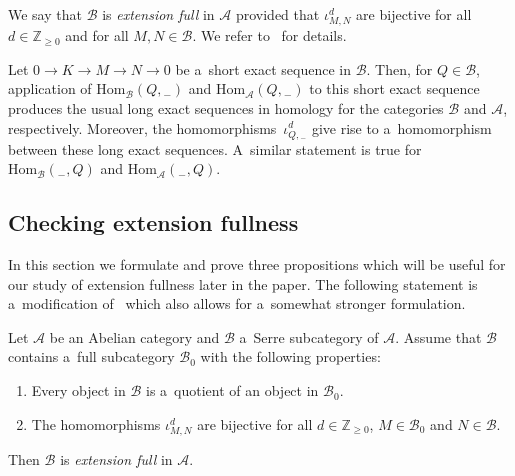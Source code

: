 \documentclass[pdftex]{sigma}
\begin{document}
We say that $\mathcal{B}$ is {\em extension full} in $\mathcal{A}$ provided that $\iota^d_{M,N}$ are bijective for all
$d\in\mathbb{Z}_{\geq0}$ and for all $M,N\in\mathcal{B}$.
We refer to~\cite[Section~2]{CoMa} for details.

Let $0\to K\to M\to N\to 0$ be a~short exact sequence in $\mathcal{B}$.
Then, for $Q\in \mathcal{B}$, application of $\mathrm{Hom}_{\mathcal{B}}(Q,{}_-)$ and
$\mathrm{Hom}_{\mathcal{A}}(Q,{}_-)$ to this short exact sequence produces the usual long exact sequences in homology
for the categories $\mathcal{B}$ and $\mathcal{A}$, respectively.
Moreover, the homomor\-phisms~$\iota^d_{Q,{}_-}$ give rise to a~homomorphism between these long exact sequences.
A~similar statement is true for $\mathrm{Hom}_{\mathcal{B}}({}_-,Q)$ and $\mathrm{Hom}_{\mathcal{A}}({}_-,Q)$.

\subsection{Checking extension fullness}%

In this section we formulate and prove three propositions which will be useful for our study of extension fullness later
in the paper.
The following statement is a~modif\/ication of~\cite[Lemma~4]{CoMa} which also allows for a~somewhat stronger formulation.

\begin{proposition}
\label{prop1}
Let $\mathcal{A}$ be an Abelian category and $\mathcal{B}$ a~Serre subcategory of $\mathcal{A}$.
Assume that $\mathcal{B}$ contains a~full subcategory $\mathcal{B}_0$ with the following properties:
\begin{enumerate}[$($a$)$]\itemsep=0pt
\item
\label{prop1.1}
Every object in $\mathcal{B}$ is a~quotient of an object in $\mathcal{B}_0$.
\item
\label{prop1.2}
The homomorphisms $\iota^d_{M,N}$ are bijective for all $d\in\mathbb{Z}_{\geq0}$, $M\in\mathcal{B}_0$ and
$N\in\mathcal{B}$.
\end{enumerate}
Then $\mathcal{B}$ is {\em extension full} in $\mathcal{A}$.
\end{proposition}
\end{document}
